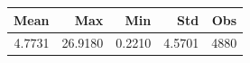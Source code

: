 \begin{tabular}{rrrrr}
\toprule
Mean & Max & Min & Std & Obs \\
\midrule
4.7731 & 26.9180 & 0.2210 & 4.5701 & 4880 \\
\bottomrule
\end{tabular}
